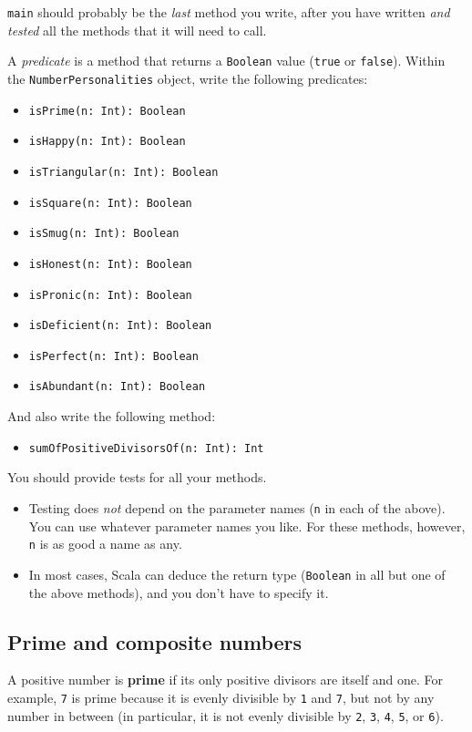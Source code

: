 \documentclass[12pt,a4paper,times]{article}
\begin{document}
\verb!main! should probably be the \emph{last} method you write,
after you have written \emph{and tested} all the methods that it will
need to call.

A \emph{predicate} is a method that returns a \texttt{Boolean} value
(\texttt{true} or \texttt{false}). Within the
\verb!NumberPersonalities! object, write the following predicates:
\begin{itemize}
\item
  \texttt{isPrime(n:\ Int):\ Boolean}
\item
  \texttt{isHappy(n:\ Int):\ Boolean}
\item
  \texttt{isTriangular(n:\ Int):\ Boolean}
\item
  \texttt{isSquare(n:\ Int):\ Boolean}
\item
  \texttt{isSmug(n:\ Int):\ Boolean}
\item
  \texttt{isHonest(n:\ Int):\ Boolean}
\item
  \texttt{isPronic(n:\ Int):\ Boolean}
\item
  \texttt{isDeficient(n:\ Int):\ Boolean}
\item
  \texttt{isPerfect(n:\ Int):\ Boolean}
\item
  \texttt{isAbundant(n:\ Int):\ Boolean}
\end{itemize}
And also write the following method:
\begin{itemize}
\item
  \texttt{sumOfPositiveDivisorsOf(n:\ Int):\ Int}
\end{itemize}
You should provide tests for all your methods.
\begin{itemize}
\item
  Testing does \emph{not} depend on the parameter names (\texttt{n} in
  each of the above). You can use whatever parameter names you like. For
  these methods, however, \texttt{n} is as good a name as any.
\item
  In most cases, Scala can deduce the return type (\texttt{Boolean} in
  all but one of the above methods), and you don't have to specify it.
\end{itemize}

\subsection{Prime and composite numbers}\label{prime-and-composite-numbers}

A positive number is \textbf{prime} if its only positive divisors are
itself and one. For example, \verb!7! is prime because it is evenly
divisible by \verb!1! and \verb!7!, but not by any number in
between (in particular, it is not evenly divisible
by \verb!2!, \verb!3!, \verb!4!, \verb!5!, or \verb!6!).
\end{document}
